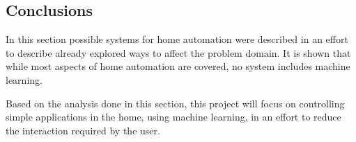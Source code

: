 \subsection{Conclusions}
In this section possible systems for home automation were described in an effort to describe already explored ways to affect the problem domain. It is shown that while most aspects of home automation are covered, no system includes machine learning.

Based on the analysis done in this section, this project will focus on controlling simple applications in the home, using machine learning, in an effort to reduce the interaction required by the user.
